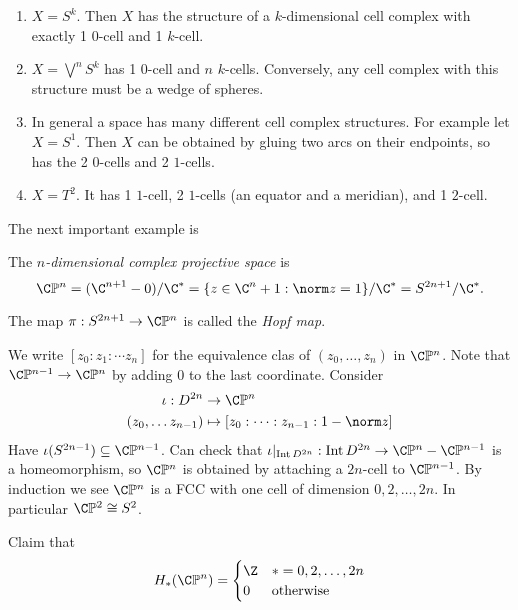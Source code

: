 \documentclass[a4paper]{article}
\DeclareMathOperator{\Int}{Int} %
\renewcommand*{\P}{\mathbb{P}}
\begin{document}
\begin{eg}\leavevmode
  \begin{enumerate}
  \item \(X = S^k\). Then \(X\) has the structure of a \(k\)-dimensional cell complex with exactly 1 \(0\)-cell and 1 \(k\)-cell.
  \item \(X = \bigvee^n S^k\) has 1 \(0\)-cell and \(n\) \(k\)-cells. Conversely, any cell complex with this structure must be a wedge of spheres.
  \item In general a space has many different cell complex structures. For example let \(X = S^1\). Then \(X\) can be obtained by gluing two arcs on their endpoints, so has the 2 \(0\)-cells and 2 \(1\)-cells.
  \item \(X = T^2\). It has 1 \(1\)-cell, 2 \(1\)-cells (an equator and a meridian), and 1 \(2\)-cell.
  \end{enumerate}
\end{eg}

The next important example is

\begin{definition}
  The \emph{\(n\)-dimensional complex projective space} is
  \[
    \C\P^n
    = (\C^{n + 1} - 0)/\C^*
    = \{z \in \C^n + 1: \norm z = 1\}/\C^*
    = S^{2n + 1}/\C^*.
  \]

  The map \(\pi: S^{2n + 1} \to \C\P^n\) is called the \emph{Hopf map}.
\end{definition}

We write \([z_0: z_1: \cdots z_n]\) for the equivalence clas of \((z_0, \dots, z_n)\) in \(\C\P^n\). Note that \(\C\P^{n - 1} \to \C\P^n\) by adding \(0\) to the last coordinate. Consider
\begin{align*}
  \iota: D^{2n} &\to \C\P^n \\
  (z_0, \dots z_{n - 1}) &\mapsto [z_0: \cdots : z_{n - 1}: 1 - \norm z]
\end{align*}
Have \(\iota(S^{2n - 1}) \subseteq \C\P^{n - 1}\). Can check that \(\iota|_{\Int D^{2n}}: \Int D^{2n} \to \C\P^n - \C\P^{n - 1}\) is a homeomorphism, so \(\C\P^n\) is obtained by attaching a \(2n\)-cell to \(\C\P^{n - 1}\). By induction we see \(\C\P^n\) is a FCC with one cell of dimension \(0, 2, \dots, 2n\). In particular \(\C\P^2 \cong S^2\).

Claim that
\[
  H_*(\C\P^n) =
  \begin{cases}
    \Z & * = 0, 2, \dots, 2n \\
    0 & \text{otherwise}
  \end{cases}
\]
\end{document}
